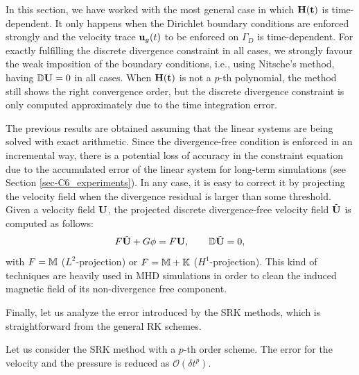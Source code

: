 \begin{remark}
In this section, we have worked with the most general case in which $\bf{H}(t)$ is time-dependent. It only happens when the Dirichlet boundary conditions are enforced strongly and the velocity trace ${\bf u}_g(t)$ to be enforced on $\Gamma_D$ is time-dependent. For exactly fulfilling the discrete divergence constraint in all cases, we strongly favour the weak imposition of the boundary conditions, i.e., using Nitsche's method, having $\mathbb{D}{\bf U} = 0$ in all cases. %
When $\bf{H}(t)$ is not a $p$-th polynomial, the method still shows the right convergence order, but the discrete divergence constraint is only computed approximately due to the time integration error.
\end{remark}

{
\begin{remark}
\label{remark3}
The previous results are obtained assuming that the linear systems are being solved with exact arithmetic. Since the divergence-free condition is enforced in an incremental way, there is a potential loss of accuracy in the constraint equation due to the accumulated error of the linear system for long-term simulations (see Section \ref{sec-C6_experiments}). In any case, it is easy to correct it by projecting the velocity field when the divergence residual is larger than some threshold. Given a velocity field ${\bf U}$, the projected discrete divergence-free velocity field $\tilde {{\bf U}}$ is computed as follows:
$$
F \tilde {{\bf U}} + G \phi = F {\bf U}, \qquad \mathbb{D} \tilde {{\bf U}} = 0,
$$
with $F = \mathbb{M}$ ($L^2$-projection) or $F = {\mathbb{M}}+\mathbb{K}$ ($H^1$-projection). This kind of techniques are heavily used in MHD simulations in order to clean the induced magnetic field of its non-divergence free component. 
\end{remark}}

Finally, let us analyze the error introduced by the SRK methods, which is straightforward from the general RK schemes.
\begin{proposition}
Let us consider the SRK method with a $p$-th order scheme. The error for the velocity and the pressure is reduced as $\mathcal{O}(\delta t^p)$. 
\end{proposition}

